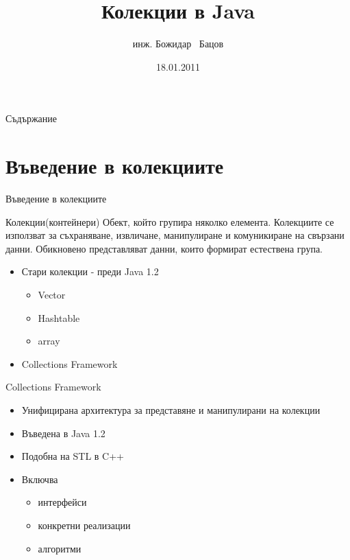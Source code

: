 \documentclass{beamer}
\title{Колекции в Java}
\author{инж. Божидар ~Бацов}
\institute{Drow Ltd.}
\date{18.01.2011}
\begin{document}
\begin{frame}
  \titlepage
\end{frame}

\begin{frame}{Съдържание}
  \tableofcontents[pausesections]
\end{frame}

\section{Въведение в колекциите}

\begin{frame}{Въведение в колекциите}
  \begin{block}{Колекции(контейнери)}
    Обект, който групира няколко елемента. Колекциите се използват за
    съхраняване, извличане, манипулиране и комуникиране на свързани
    данни. Обикновено представляват данни, които формират естествена група.
  \end{block}
  \begin{itemize}
  \item
    Стари колекции - преди Java 1.2
    \begin{itemize}
      \item Vector
      \item Hashtable
      \item array
    \end{itemize}
  \item Collections Framework
  \end{itemize}
\end{frame}

\begin{frame}{Collections Framework}
  \transdissolve
  \begin{itemize}
  \item  Унифицирана архитектура за представяне и манипулирани на
    колекции    
   \item Въведена в Java 1.2
  \item Подобна на STL в C++
  \item Включва
    \begin{itemize}
    \item интерфейси
    \item конкретни реализации
    \item алгоритми
    \end{itemize}
  \end{itemize}
\end{frame}
\end{document}
